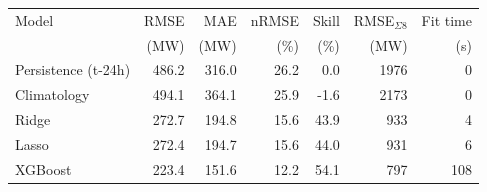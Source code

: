 \begin{tabular}{lrrrrrr}
\toprule
Model & RMSE & MAE & nRMSE & Skill & RMSE$_{\Sigma 8}$ & Fit time \\
 & (MW) & (MW) & (\%) & (\%) & (MW) & (s) \\
\midrule
Persistence (t-24h) & 486.2 & 316.0 & 26.2 & 0.0 & 1976 & 0 \\
Climatology & 494.1 & 364.1 & 25.9 & -1.6 & 2173 & 0 \\
Ridge & 272.7 & 194.8 & 15.6 & 43.9 & 933 & 4 \\
Lasso & 272.4 & 194.7 & 15.6 & 44.0 & 931 & 6 \\
XGBoost & 223.4 & 151.6 & 12.2 & 54.1 & 797 & 108 \\
\bottomrule
\end{tabular}